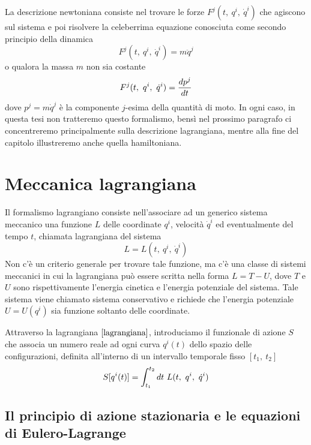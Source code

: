     La descrizione newtoniana consiste nel trovare le forze $F^j(t, ~q^i, ~ \dot q^i)$ che agiscono sul sistema e poi risolvere la celeberrima equazione conosciuta come secondo principio della dinamica
    \begin{equation*}
        F^j(t, ~q^i, ~ \dot q^i) = m \ddot q^j
    \end{equation*}
    o qualora la massa $m$ non sia costante 
    \begin{equation*}
        F^j(t, ~q^i, ~ \dot q^i) = \frac{dp^j}{dt}
    \end{equation*}
    dove $p^j = m \dot q^j$ è la componente $j$-esima della quantità di moto. In ogni caso, in questa tesi non tratteremo questo formalismo, bensì nel prossimo paragrafo ci concentreremo principalmente sulla descrizione lagrangiana, mentre alla fine del capitolo illustreremo anche quella hamiltoniana.
    
\section{Meccanica lagrangiana}

    Il formalismo lagrangiano consiste nell'associare ad un generico sistema meccanico una funzione $L$ delle coordinate $q^i$, velocità $\dot q^i$ ed eventualmente del tempo $t$, chiamata lagrangiana del sistema
    \begin{equation} \label{lagrangiana}
        L = L(t, ~q^i, ~\dot q^i) 
    \end{equation}  
    Non c'è un criterio generale per trovare tale funzione, ma c'è una classe di sistemi meccanici in cui la lagrangiana può essere scritta nella forma $L = T - U$, dove $T$ e $U$ sono rispettivamente l'energia cinetica e l'energia potenziale del sistema. Tale sistema viene chiamato sistema conservativo e richiede che l'energia potenziale $U = U(q^i)$ sia funzione soltanto delle coordinate.
    
    Attraverso la lagrangiana $\eqref{lagrangiana}$, introduciamo il funzionale di azione $S$ che associa un numero reale ad ogni curva $q^i(t)$ dello spazio delle configurazioni, definita all'interno di un intervallo temporale fisso $[t_1, ~t_2]$
    \begin{equation} \label{azione}
        S[q^i(t)] = \int_{t_1}^{t_2}dt~ L(t, ~q^i, ~\dot q^i)
    \end{equation}

\subsection{Il principio di azione stazionaria e le equazioni di Eulero-Lagrange}

